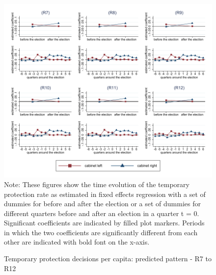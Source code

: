 \documentclass[11pt,a4paper]{scrartcl}
\begin{document}
\clearpage
\FloatBarrier



\clearpage
\FloatBarrier





\clearpage
\FloatBarrier


\clearpage
\FloatBarrier
\begin{figure}[!ht]
	\caption{Temporary protection decisions per capita: predicted pattern - R7 to R12}
	\includegraphics[width=1\textwidth]{../results/decisions/temporary_protection_rate_graphs_R7-R12.pdf}
	\scriptsize{Note: These figures show the time evolution of the temporary protection rate as estimated in fixed effects regression with a set of dummies for before and after the election or a set of dummies for different quarters before and after an election in a quarter t = 0. Significant coefficients are indicated by filled plot markers. Periods in which the two coefficients are significantly different from each other are indicated with bold font on the x-axis.}
\end{figure}

\clearpage
\FloatBarrier



\clearpage
\FloatBarrier



\clearpage
\FloatBarrier


\end{document}
